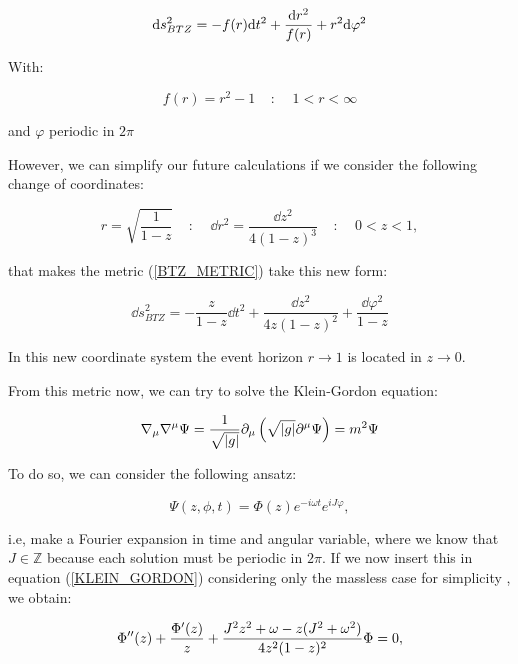 \documentclass[11pt,a4paper]{article}
\begin{document}
\begin{equation}\LA{BTZ_METRIC}
    \dd s^2_{BTZ} = -f(r)\dd t^2 + \frac{\dd r^2}{f(r)} + r^2 \dd\varphi^2
\end{equation}

{\noindent With:}

\begin{equation}
    f(r) = r^2 - 1 ~~~~~:~~~~~ 1 < r < \infty
\end{equation}

{\noindent and $\varphi$ periodic in $2\pi$}

However, we can simplify our future calculations if we consider the following change of coordinates:

\begin{equation}
    r = \sqrt{\frac{1}{1-z}} ~~~~~:~~~~~ \dd r^2 = \frac{\dd z^2}{4(1-z)^3} ~~~~~:~~~~~ 0 < z < 1,
\end{equation}

{\noindent that makes the metric (\ref{BTZ_METRIC}) take this new form:}

\begin{equation}
    \dd s^2_{BTZ} = -\frac{z}{1-z}\dd t^2 + \frac{\dd z^2 }{4z(1-z)^2} + \frac{\dd\varphi^2}{1-z}
\end{equation}

{\noindent In this new coordinate system the event horizon $r\rightarrow 1$ is located in $z\rightarrow 0$.}

From this metric now, we can try to solve the Klein-Gordon equation:

\begin{equation}\LA{KLEIN_GORDON}
    \nabla_\mu\nabla^\mu \Psi =\frac{1}{\sqrt{\abs{g}}}\del_\mu\left(\sqrt{\abs{g}}\del^\mu\Psi\right)= m^2\Psi
\end{equation}

{\noindent To do so, we can consider the following ansatz: }

\begin{equation}
    \Psi(z,\phi,t) = \Phi(z)e^{-i\omega t}e^{iJ\varphi},
\end{equation}

{\noindent i.e, make a Fourier expansion in time and angular variable, where we know that $J\in\mathds{Z}$ because each solution must be periodic in $2\pi$. If we now insert this in equation (\ref{KLEIN_GORDON}) considering only the massless case for simplicity \cite{Jeong_2025,Das_2023,das2023fuzzballsrandommatrices}, we obtain:}

\begin{equation}
    \Phi''(z) + \frac{\Phi'(z)}{z} + \frac{J^2z^2+\omega-z(J^2+\omega^2)}{4z^2(1-z)^2}\Phi=0,
\end{equation}
\end{document}
